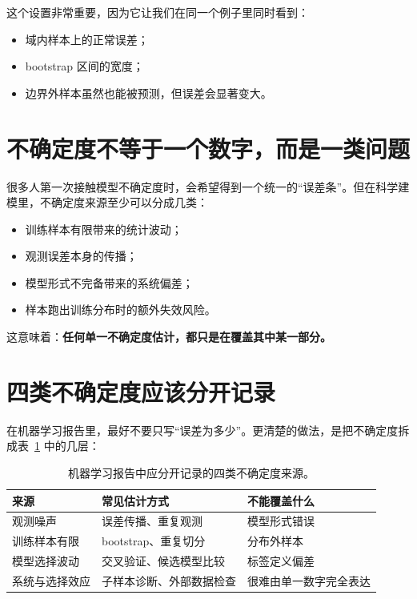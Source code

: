 这个设置非常重要，因为它让我们在同一个例子里同时看到：

\begin{itemize}
    \item 域内样本上的正常误差；
    \item bootstrap 区间的宽度；
    \item 边界外样本虽然也能被预测，但误差会显著变大。
\end{itemize}

\section{不确定度不等于一个数字，而是一类问题}

很多人第一次接触模型不确定度时，会希望得到一个统一的“误差条”。但在科学建模里，不确定度来源至少可以分成几类：

\begin{itemize}
    \item 训练样本有限带来的统计波动；
    \item 观测误差本身的传播；
    \item 模型形式不完备带来的系统偏差；
    \item 样本跑出训练分布时的额外失效风险。
\end{itemize}

这意味着：\textbf{任何单一不确定度估计，都只是在覆盖其中某一部分。}

\section{四类不确定度应该分开记录}

在机器学习报告里，最好不要只写“误差为多少”。更清楚的做法，是把不确定度拆成表~\ref{tab:ch25_uncertainty_sources} 中的几层：

\begin{table}[htbp]
\centering
\begin{tabular}{p{}p{}p{}}
\toprule
来源 & 常见估计方式 & 不能覆盖什么 \\
\midrule
观测噪声 & 误差传播、重复观测 & 模型形式错误 \\
训练样本有限 & bootstrap、重复切分 & 分布外样本 \\
模型选择波动 & 交叉验证、候选模型比较 & 标签定义偏差 \\
系统与选择效应 & 子样本诊断、外部数据检查 & 很难由单一数字完全表达 \\
\bottomrule
\end{tabular}
\caption{机器学习报告中应分开记录的四类不确定度来源。}
\label{tab:ch25_uncertainty_sources}
\end{table}

